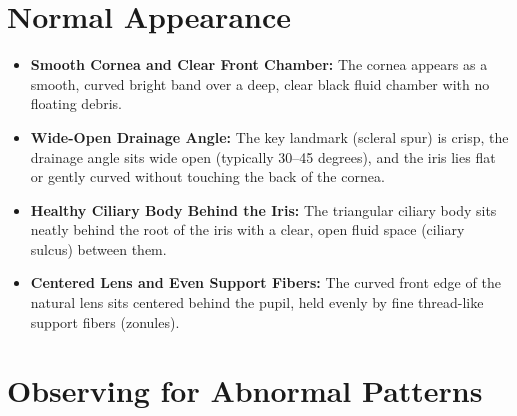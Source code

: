 \section{Normal Appearance}

\begin{itemize}
    \item \textbf{Smooth Cornea and Clear Front Chamber:} The cornea appears as a smooth, curved bright band over a deep, clear black fluid chamber with no floating debris.
    \item \textbf{Wide-Open Drainage Angle:} The key landmark (scleral spur) is crisp, the drainage angle sits wide open (typically 30--45 degrees), and the iris lies flat or gently curved without touching the back of the cornea.
    \item \textbf{Healthy Ciliary Body Behind the Iris:} The triangular ciliary body sits neatly behind the root of the iris with a clear, open fluid space (ciliary sulcus) between them.
    \item \textbf{Centered Lens and Even Support Fibers:} The curved front edge of the natural lens sits centered behind the pupil, held evenly by fine thread-like support fibers (zonules).
\end{itemize}

\section{Observing for Abnormal Patterns}

